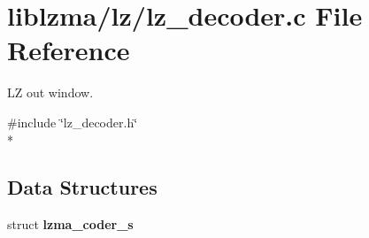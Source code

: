 \section{liblzma/lz/lz\-\_\-decoder.c File Reference}
\label{lz__decoder_8c}


L\-Z out window.  


{\ttfamily \#include \char`\"{}lz\-\_\-decoder.\-h\char`\"{}}\\*
\subsection*{Data Structures}
\begin{DoxyCompactItemize}
\item 
struct {\bf lzma\-\_\-coder\-\_\-s}
\end{DoxyCompactItemize}
